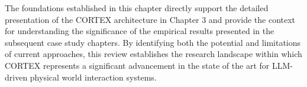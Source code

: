The foundations established in this chapter directly support the detailed presentation of the CORTEX architecture in Chapter 3 and provide the context for understanding the significance of the empirical results presented in the subsequent case study chapters. By identifying both the potential and limitations of current approaches, this review establishes the research landscape within which CORTEX represents a significant advancement in the state of the art for LLM-driven physical world interaction systems.
